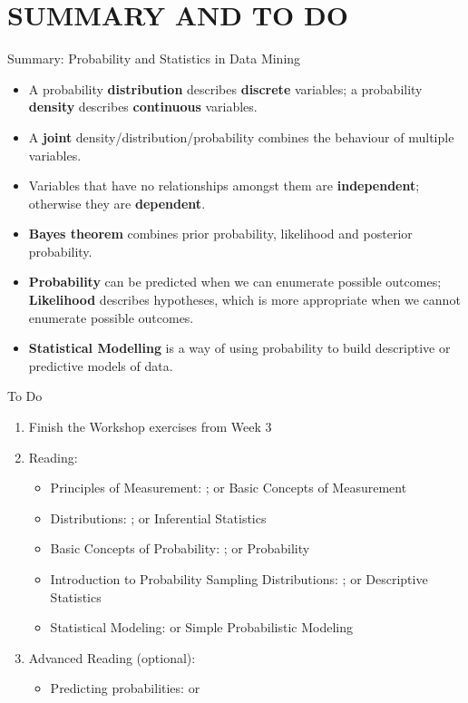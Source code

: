 \documentclass[handout]{beamer}
\newcommand{\strong}[1]{\textbf{\color{teal} #1}}
\begin{document}
\section*{SUMMARY AND TO DO}
\begin{frame}{Summary: Probability and Statistics in Data Mining}
\begin{itemize}
\item A probability \strong{distribution} describes \strong{discrete} variables; a probability \strong{density} describes \strong{continuous} variables.
\item A \strong{joint} density/distribution/probability combines the behaviour of multiple variables.
\item Variables that have no relationships amongst them are \strong{independent}; otherwise they are \strong{dependent}.
\item \strong{Bayes theorem} combines prior probability, likelihood and posterior probability.
\item \strong{Probability} can be predicted when we can enumerate possible outcomes; \strong{Likelihood} describes hypotheses, which is more appropriate when we cannot enumerate possible outcomes.
\item \strong{Statistical Modelling} is a way of using probability to build descriptive or predictive models of data.
\end{itemize}
\end{frame}
\begin{frame}{To Do}
\begin{enumerate}
\item Finish the Workshop exercises from Week 3
\item Reading:
	\begin{itemize}
	\item Principles of Measurement: \cite[ch 1]{lowry:1998-2022}; or Basic Concepts of Measurement \cite[ch 1]{boslaugh:2013}
	\item Distributions: \cite[ch 2]{lowry:1998-2022}; or Inferential Statistics \cite[ch 3]{boslaugh:2013}
	\item Basic Concepts of Probability: \cite[ch 5]{lowry:1998-2022}; or Probability \cite[ch 2]{boslaugh:2013}
	\item Introduction to Probability Sampling Distributions: \cite[ch 6]{lowry:1998-2022}; or Descriptive Statistics \cite[ch 4]{boslaugh:2013}
	\item Statistical Modeling: \cite[ch 4.2]{WFH3:2011} or Simple Probabilistic Modeling \cite[4.2]{WFH4:2016}
	\end{itemize}
\item Advanced Reading (optional):
	\begin{itemize}
	\item Predicting probabilities: \cite[ch 5.6]{WFH3:2011} or \cite[ch 5.7]{WFH4:2016}
	\end{itemize}
\end{enumerate}
\end{frame}
\end{document}

